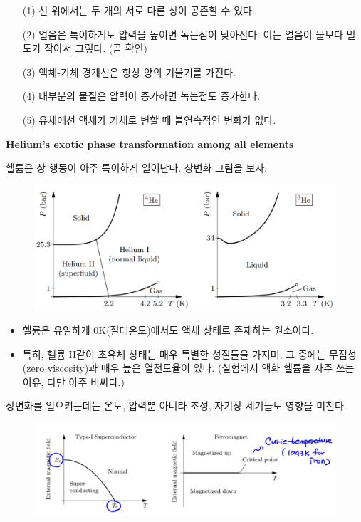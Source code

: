 \documentclass{article}
\begin{document}
\begin{enumerate}
    \item[(1)] 선 위에서는 두 개의 서로 다른 상이 공존할 수 있다.
    \item[(2)] 얼음은 특이하게도 압력을 높이면 녹는점이 낮아진다. 이는 얼음이 물보다 밀도가 작아서 그렇다. (곧 확인)
    \item[(3)] 액체-기체 경계선은 항상 양의 기울기를 가진다. 
    \item[(4)] 대부분의 물질은 압력이 증가하면 녹는점도 증가한다.
    \item[(5)] 유체에선 액체가 기체로 변할 때 불연속적인 변화가 없다.
\end{enumerate}

\noindent
\textbf{Helium's exotic phase transformation among all elements}

헬륨은 상 행동이 아주 특이하게 일어난다. 상변화 그림을 보자.

\begin{figure}[h]
    \centering
    \includegraphics[width=0.78\linewidth]{images/fig3_2.png}
\end{figure}

\begin{itemize}
    \item 헬륨은 유일하게 0K(절대온도)에서도 액체 상태로 존재하는 원소이다.
    \item 특히, 헬륨 II같이 초유체 상태는 매우 특별한 성질들을 가지며, 그 중에는 무점성(zero viscosity)과 매우 높은 열전도율이 있다. (실험에서 액화 헬륨을 자주 쓰는 이유, 다만 아주 비싸다.)
\end{itemize}

\newpage

상변화를 일으키는데는 온도, 압력뿐 아니라 조성, 자기장 세기들도 영향을 미친다. 

\begin{figure}[h]
    \centering
    \includegraphics[width=0.9\linewidth]{images/fig3_3.png}
\end{figure}
\end{document}
